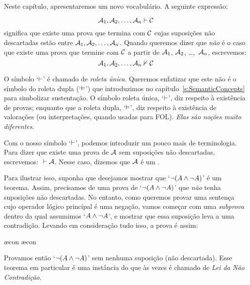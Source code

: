  Neste cap\'itulo, apresentaremos um novo vocabul\'ario. A seguinte express\~ao:
 
$$\mathcal{A}_1, \mathcal{A}_2, \ldots, \mathcal{A}_n \vdash \mathcal{C}$$
significa que existe uma prova que termina com $\mathcal{C}$  cujas suposi\c c\~oes n\~ao descartadas est\~ao entre $\mathcal{A}_1, \mathcal{A}_2, \ldots, \mathcal{A}_n$. Quando queremos dizer que  \emph{n\~ao} \'e o caso que existe uma prova que termine com $\mathcal{C}$ a partir de $\mathcal{A}_1$, $\mathcal{A}_2$, \dots,~$\mathcal{A}_n$, escrevemos:  $$\mathcal{A}_1, \mathcal{A}_2, \ldots, \mathcal{A}_n \nvdash \mathcal{C}$$  

O s\'imbolo `$\vdash$'  \'e chamado de  \emph{roleta \'unica}. Queremos enfatizar que este n\~ao \'e o s\'imbolo do roleta dupla (`$\vDash$') que introduzimos no cap\'itulo~\ref{s:SemanticConcepts}  para simbolizar sustenta\c c\~ao. O s\'imbolo roleta \'unica, `$\vdash$', diz respeito \`a exist\^encia de provas; enquanto que a roleta dupla, `$\vDash$', diz respeito \`a exist\^encia de valora\c c\~oes (ou interpreta\c c\~oes, quando usadas para FOL). \emph{Elas s\~ao no\c c\~oes muito diferentes}.

Com o nosso s\'imbolo  `$\vdash$',  podemos introduzir um pouco mais de terminologia. Para dizer que existe uma prova de $\mathcal{A}$ sem suposi\c c\~oes n\~ao descartadas, escrevemos: ${} \vdash \mathcal{A}$. Nesse caso, dizemos que $\mathcal{A}$ \'e um .

Para ilustrar isso, suponha que desejamos mostrar que `$\neg (A \wedge \neg A)$' \'e um teorema. Assim, precisamos de uma prova de `$\neg(A \wedge \neg A)$' que \emph{n\~ao} tenha suposi\c c\~oes n\~ao descartadas. No entanto, como queremos provar uma senten\c ca cujo operador l\'ogico principal \'e uma nega\c c\~ao, vamos come\c car com uma \emph{subprova}  dentro da qual assumimos `$A \wedge \neg A$', e mostrar que essa suposi\c c\~ao leva a uma contradi\c c\~ao. Levando em considera\c c\~ao tudo isso, a prova \'e assim:
	\begin{fitchproof}
		\open
			\ae{con}
			\ae{con}
		\close
	\end{fitchproof}
Provamos ent\~ao `$\neg (A \wedge \neg A)$' sem nenhuma suposi\c c\~ao (n\~ao descartada).  Esse teorema em particular \'e uma inst\^ancia do que \`as vezes \'e chamado de \emph{Lei da N\~ao Contradi\c c\~ao}.

